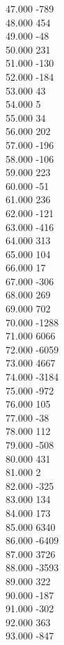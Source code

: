{ 47.000	-789 \\
 48.000	454 \\
 49.000	-48 \\
 50.000	231 \\
 51.000	-130 \\
 52.000	-184 \\
 53.000	43 \\
 54.000	5 \\
 55.000	34 \\
 56.000	202 \\
 57.000	-196 \\
 58.000	-106 \\
 59.000	223 \\
 60.000	-51 \\
 61.000	236 \\
 62.000	-121 \\
 63.000	-416 \\
 64.000	313 \\
 65.000	104 \\
 66.000	17 \\
 67.000	-306 \\
 68.000	269 \\
 69.000	702 \\
 70.000	-1288 \\
 71.000	6066 \\
 72.000	-6059 \\
 73.000	4667 \\
 74.000	-3184 \\
 75.000	-972 \\
 76.000	105 \\
 77.000	-38 \\
 78.000	112 \\
 79.000	-508 \\
 80.000	431 \\
 81.000	2 \\
 82.000	-325 \\
 83.000	134 \\
 84.000	173 \\
 85.000	6340 \\
 86.000	-6409 \\
 87.000	3726 \\
 88.000	-3593 \\
 89.000	322 \\
 90.000	-187 \\
 91.000	-302 \\
 92.000	363 \\
 93.000	-847 \\
}
